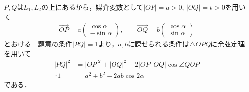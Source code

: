 \documentclass[../../main.tex]{subfiles}
\begin{document}
$P,Q$は$L_1,L_2$の上にあるから，媒介変数として$|OP|=a>0$, $|OQ|=b>0$を用いて
\begin{align}
  \overrightarrow{OP}=a
  \begin{pmatrix}\cos\alpha\\-\sin\alpha
  \end{pmatrix},\qquad\overrightarrow{OQ}=b
  \begin{pmatrix}\cos\alpha\\ \sin\alpha
  \end{pmatrix}
\end{align}
とおける．題意の条件$|PQ|=1$より，$a,b$に課せられる条件は$\triangle OPQ$に余弦定理を用いて
\begin{align}
  |PQ|^2 &= |OP|^2 + |OQ|^2 -2|OP||OQ|\cos\angle QOP \\
  \therefore
  1 &=a^2+b^2-2ab\cos2\alpha \label{eq:1}
\end{align}
である．
\end{document}
